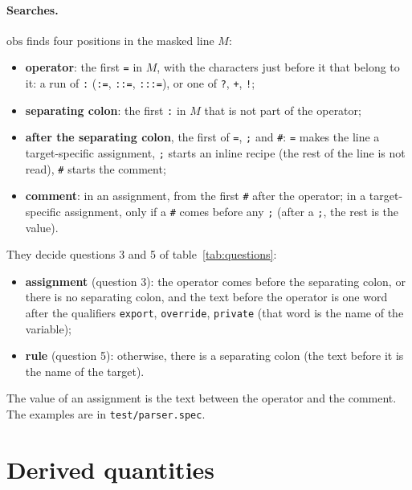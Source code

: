 \documentclass[11pt]{article}
\newcommand{\code}[1]{\mbox{\texttt{#1}}}
\newcommand{\obs}{\mathrm{obs}}
\begin{document}
\paragraph{Searches.} $\obs$ finds four positions in the masked line $M$:
\begin{itemize}
  \item \textbf{operator}: the first \code{=} in $M$, with the characters just before it
        that belong to it: a run of \code{:} (\code{:=}, \code{::=}, \code{:::=}), or one of
        \code{?}, \code{+}, \code{!};
  \item \textbf{separating colon}: the first \code{:} in $M$ that is not part of the
        operator;
  \item \textbf{after the separating colon}, the first of \code{=}, \code{;} and \code{\#}:
        \code{=} makes the line a target-specific assignment, \code{;} starts an inline
        recipe (the rest of the line is not read), \code{\#} starts the comment;
  \item \textbf{comment}: in an assignment, from the first \code{\#} after the operator; in
        a target-specific assignment, only if a \code{\#} comes before any \code{;} (after
        a \code{;}, the rest is the value).
\end{itemize}
They decide questions 3 and 5 of table~\ref{tab:questions}:
\begin{itemize}
  \item \textbf{assignment} (question 3): the operator comes before the separating colon, or
        there is no separating colon, and the text before the operator is one word after
        the qualifiers \code{export}, \code{override}, \code{private} (that word is the name
        of the variable);
  \item \textbf{rule} (question 5): otherwise, there is a separating colon (the text before
        it is the name of the target).
\end{itemize}
The value of an assignment is the text between the operator and the comment. The examples
are in \code{test/parser.spec}.

\section{Derived quantities}
\label{sec:derived}
\end{document}
